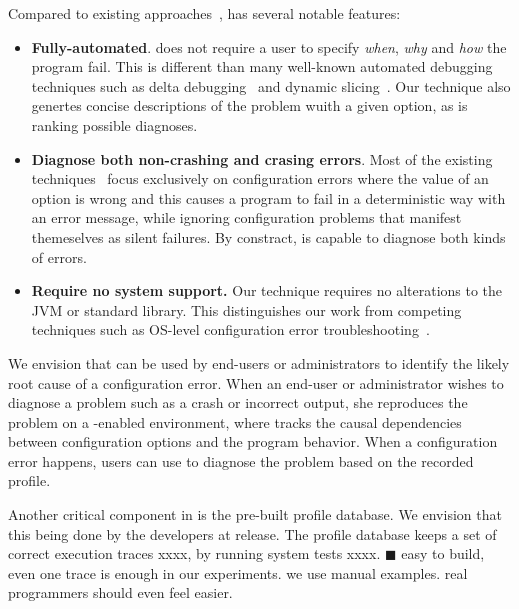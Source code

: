 
Compared to existing approaches~\cite{Zeller:2002:ICC, Zhang:2003:PDS,
Rabkin:2011:PPC, Whitaker:2004:CDS, Attariyan:2010:ACT, Wang:2004:AMT}, \ourtool has
several notable features:

\begin{itemize}
\item \textbf{Fully-automated}.
\ourtool does not require a user to specify
\textit{when}, \textit{why} and \textit{how} the program fail. This is
different than many well-known automated debugging techniques such
as delta debugging~\cite{Zeller:2002:ICC} and dynamic slicing~\cite{Zhang:2003:PDS}.
Our technique also genertes concise descriptions of the problem
wuith a given option, as is ranking possible diagnoses.

\item \textbf{Diagnose both non-crashing and crasing errors}.
Most of the existing techniques~\cite{Rabkin:2011:PPC,
Whitaker:2004:CDS, Attariyan:2010:ACT} focus exclusively on configuration errors
where the value of an option is wrong and this causes a program
to fail in a deterministic way with an error message, while
ignoring configuration problems that manifest themeselves as
silent failures. By constract, \ourtool is capable to diagnose
both kinds of errors.

\item \textbf{Require no system support.} Our technique requires no alterations to
the JVM or standard library. This distinguishes our work from
competing techniques such as OS-level configuration
error troubleshooting~\cite{Whitaker:2004:CDS}.%

\end{itemize}


We envision that \ourtool can be used by end-users or
administrators to identify the likely root cause of a configuration error.
When an end-user or administrator wishes to diagnose a
problem such as a crash or incorrect output, she
reproduces the problem on a \ourtool-enabled environment,
where \ourtool tracks the causal dependencies between
configuration options and the program behavior. 
When a configuration error happens, users can
use \ourtool to diagnose the problem based on the recorded profile.

Another critical component in \ourtool is the pre-built
profile database. We envision that this being done
by the developers at release. The profile database keeps
a set of correct execution traces xxxx, by running system
tests xxxx. $\blacksquare$ easy to build, even one trace
is enough in our experiments. we use manual examples. real programmers
should even feel easier.


